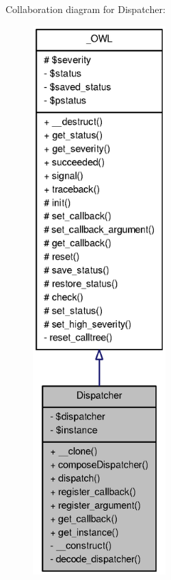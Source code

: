 Collaboration diagram for Dispatcher:\nopagebreak
\begin{figure}[H]
\begin{center}
\leavevmode
\includegraphics[height=600pt]{classDispatcher__coll__graph}
\end{center}
\end{figure}
